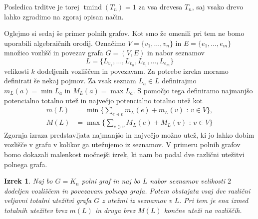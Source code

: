 \documentclass[12pt,a4paper,twoside]{article}
\theoremstyle{definition} %
\theoremstyle{plain} %
\newtheorem{izrek}[definicija]{Izrek}
\numberwithin{equation}{section}  %
\DeclareMathOperator{\tmind}{tmind}
\begin{document}
Posledica trditve je torej $\tmind(T_n) = 1$ za vsa drevesa $T_n$, saj vsako drevo lahko zgradimo na zgoraj opisan način.

Oglejmo si sedaj še primer polnih grafov. Kot smo že omenili pri tem ne bomo uporabili algebraičnih orodij. Označimo $V = \{v_1, \ldots, v_n\}$ in $E = \{e_1, \ldots, e_m\}$ množico vozlišč in povezav grafa $G=(V,E)$ in nabor seznamov
 $$L = \{L_{v_1}, \ldots, L_{v_n}, L_{e_1}, \ldots, L_{e_m}\}$$ velikosti $k$ dodeljenih vozliščem in povezavam. Za potrebe izreka moramo definirati še nekaj pojmov. Za vsak seznam $L_a \in L$ definirajmo $m_L(a) = \min L_a$ in $M_L(a) = \max L_a$. S pomočjo tega definiramo najmanjšo potencialno totalno utež in največjo potencialno totalno utež kot
\begin{equation*}
\begin{split}
m(L) &= \min \Big \{ \sum_{e \ni v} m_L(e) + m_L(v) \text{ : } v \in V\Big \}, \\
M(L) &= \max \Big\{ \sum_{e \ni v} M_L(e) + M_L(v) \text{ : } v \in V\Big \} 
\end{split}
\end{equation*}
Zgornja izraza predstavljata najmanjšo in največjo možno utež, ki jo lahko dobim vozlišče v grafu v kolikor ga utežujemo iz seznamov. V primeru polnih grafov bomo dokazali malenkost  močnejši izrek, ki nam bo podal dve različni utežitvi polnega grafa.
\begin{izrek}
Naj bo $G = K_n$ polni graf in naj bo $L$ nabor seznamov velikosti $2$ dodeljen vozliščem in povezavam polnega grafa. Potem obstajata vsaj dve različni veljavni totalni utežitvi grafa $G$ z utežmi iz seznamov v $L$. Pri tem je ena izmed totalnih utežitev brez $m(L)$ in druga brez $M(L)$ končne uteži na vozliščih.
\end{izrek}
\end{document}
